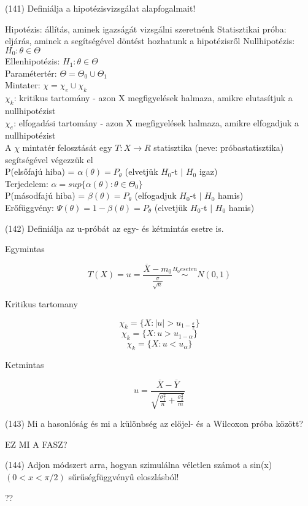 \documentclass[12p]{article}
\begin{document}
(141) Definiálja a hipotézisvizsgálat alapfogalmait!

Hipotézis: állítás, aminek igazságát vizsgálni szeretnénk
Statisztikai próba: eljárás, aminek a segítségével döntést hozhatunk a hipotézisről
Nullhipotézis: $H_0 : \theta \in \Theta$\\
Ellenhipotézis: $H_1 : \theta \in \Theta$\\
Paramétertér: $\Theta = \Theta_0 \cup \Theta_1$\\
Mintater: $\chi = \chi_e \cup \chi_k$\\
$\chi_k$: kritikus tartomány - azon X megfigyelések halmaza, amikre elutasítjuk a nullhipotézist\\
$\chi_e$: elfogadási tartomány - azon X megfigyelések halmaza, amikre elfogadjuk a nullhipotézist\\
A $\chi$ mintatér felosztását egy $T : X \rightarrow R$ statisztika (neve: próbastatisztika) segítségével végezzük el\\
P(elsőfajú hiba) = $\alpha(\theta) = P_\theta$ (elvetjük $H_0$-t $|$ $H_0$ igaz)\\
Terjedelem: $\alpha = sup\{\alpha(\theta) : \theta \in \Theta_0\}$\\
P(másodfajú hiba) = $\beta(\theta) = P_\theta$ (elfogadjuk $H_0$-t $|$ $H_0$ hamis)\\
Erőfüggvény: $\Psi(\theta) = 1 - \beta(\theta) = P_\theta$ (elvetjük $H_0$-t $|$ $H_0$ hamis)

(142)  Definiálja az u-próbát az egy- és kétmintás esetre is.

Egymintas

$$T(X) = u = \frac{\overline{X} - m_0}{\frac{\sigma}{\sqrt{n}}} \stackrel{H_0 eseten}{\sim} N(0, 1)$$

Kritikus tartomany

$$\chi_k = \{X: |u| > u_{1-\frac{\sigma}{2}}\}$$
$$\chi_k = \{X: u > u_{1-\alpha}\}$$
$$\chi_k = \{X: u < u_\alpha\}$$

Ketmintas

$$\displaystyle{u = \frac{\overline{X} - \overline{Y}}{\sqrt{\frac{\sigma_1^2}{n} + \frac{\sigma_2^2}{m}}}}$$

(143) Mi a hasonlóság és mi a különbség az előjel- és a Wilcoxon próba között?

EZ MI A FASZ?

(144) Adjon módszert arra, hogyan szimulálna véletlen számot a sin(x) $(0 < x < \pi/2)$ sűrűségfüggvényű eloszlásból!

??
\end{document}
